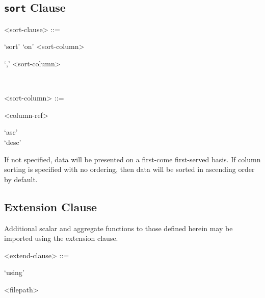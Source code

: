 \subsection{\texttt{sort} Clause}

\begin{grammar}
  <sort-clause> ::= \begin{syntdiag}
    `sort' `on'
    <sort-column>
    \begin{stack}
      \begin{rep}`,' <sort-column>\end{rep} \\
    \end{stack}
  \end{syntdiag}

  <sort-column> ::= \begin{syntdiag}
    <column-ref>
    \begin{stack}
      `asc' \\
      `desc' \\
    \end{stack}
  \end{syntdiag}
\end{grammar}

If not specified, data will be presented on a first-come first-served
basis. If column sorting is specified with no ordering, then data will
be sorted in ascending order by default.


\subsection{Extension Clause}

Additional scalar and aggregate functions to those defined herein may be
imported using the extension clause.

\begin{grammar}
  <extend-clause> ::= \begin{syntdiag}
    `using'
    \begin{rep}
      <filepath>
    \end{rep}
  \end{syntdiag}
\end{grammar}
